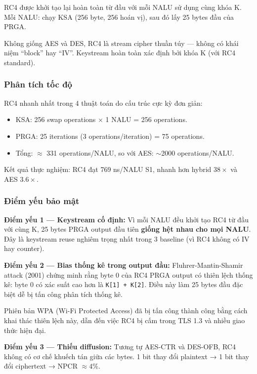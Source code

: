 RC4 được khởi tạo lại hoàn toàn từ đầu với mỗi NALU sử dụng cùng khóa K.
Mỗi NALU: chạy KSA (256 byte, 256 hoán vị), sau đó lấy 25 bytes đầu của PRGA.

Không giống AES và DES, RC4 là stream cipher thuần túy --- không có khái niệm
``block'' hay ``IV''. Keystream hoàn toàn xác định bởi khóa K (với RC4 standard).

\subsubsection{Phân tích tốc độ}

RC4 nhanh nhất trong 4 thuật toán do cấu trúc cực kỳ đơn giản:
\begin{itemize}
  \item KSA: 256 swap operations $\times$ 1 NALU = 256 operations.
  \item PRGA: 25 iterations (3 operations/iteration) = 75 operations.
  \item Tổng: $\approx$ 331 operations/NALU, so với AES: $\sim$2000 operations/NALU.
\end{itemize}

Kết quả thực nghiệm: RC4 đạt 769 ns/NALU S1, nhanh hơn hybrid $38\times$ và AES $3.6\times$.

\subsubsection{Điểm yếu bảo mật}

\textbf{Điểm yếu 1 --- Keystream cố định:}
Vì mỗi NALU đều khởi tạo RC4 từ đầu với cùng K, 25 bytes PRGA output đầu tiên
\textbf{giống hệt nhau cho mọi NALU}. Đây là keystream reuse nghiêm trọng nhất
trong 3 baseline (vì RC4 không có IV hay counter).

\textbf{Điểm yếu 2 --- Bias thống kê trong output đầu:}
Fluhrer-Mantin-Shamir attack \cite{fms_rc4} (2001) chứng minh rằng byte 0 của
RC4 PRGA output có thiên lệch thống kê: byte 0 có xác suất cao hơn là \texttt{K[1] + K[2]}.
Điều này làm 25 bytes đầu đặc biệt dễ bị tấn công phân tích thống kê.

Phiên bản WPA (Wi-Fi Protected Access) đã bị tấn công thành công bằng cách khai
thác thiên lệch này, dẫn đến việc RC4 bị cấm trong TLS 1.3 và nhiều giao thức hiện đại.

\textbf{Điểm yếu 3 --- Thiếu diffusion:}
Tương tự AES-CTR và DES-OFB, RC4 không có cơ chế khuếch tán giữa các bytes.
1 bit thay đổi plaintext → 1 bit thay đổi ciphertext → NPCR $\approx 4\%$.

